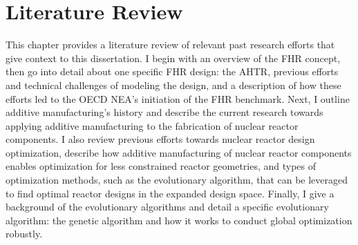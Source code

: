 \chapter{Literature Review}
\label{chap:lit-review}

This chapter provides a literature review of relevant past research efforts 
that give context to this dissertation. 
I begin with an overview of the \gls{FHR} concept, 
then go into detail about one specific \gls{FHR} design: the \gls{AHTR}, 
previous efforts and technical challenges of modeling the design, and a 
description of how these efforts led to the \gls{OECD} \gls{NEA}'s initiation 
of the \gls{FHR} benchmark.
Next, I outline additive manufacturing's history and describe the current 
research towards applying additive manufacturing to the fabrication of 
nuclear reactor components. 
I also review previous efforts towards nuclear reactor design optimization, 
describe how additive manufacturing of nuclear reactor components enables 
optimization for less constrained reactor geometries, and types of optimization 
methods, such as the evolutionary algorithm, that can be leveraged to find 
optimal reactor designs in the expanded design space.   
Finally, I give a background of the evolutionary algorithms and detail a specific 
evolutionary algorithm: the genetic algorithm and how it works to conduct global 
optimization robustly.


